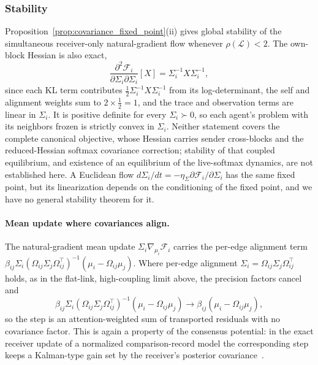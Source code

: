 \documentclass[11pt]{article}
\begin{document}
\subsubsection{Stability}

Proposition~\ref{prop:covariance_fixed_point}(ii) gives global stability of the simultaneous receiver-only natural-gradient flow whenever $\rho(\mathcal{L}) < 2$. The own-block Hessian is also exact,
\begin{equation}
\frac{\partial^2 \mathcal{F}_i}{\partial \Sigma_i \partial \Sigma_i}[X]
= \Sigma_i^{-1} X \Sigma_i^{-1},
\end{equation}
since each KL term contributes $\tfrac{1}{2}\Sigma_i^{-1}X\Sigma_i^{-1}$ from its log-determinant, the self and alignment weights sum to $2 \times \tfrac{1}{2} = 1$, and the trace and observation terms are linear in $\Sigma_i$. It is positive definite for every $\Sigma_i \succ 0$, so each agent's problem with its neighbors frozen is strictly convex in $\Sigma_i$. Neither statement covers the complete canonical objective, whose Hessian carries sender cross-blocks and the reduced-Hessian softmax covariance correction; stability of that coupled equilibrium, and existence of an equilibrium of the live-softmax dynamics, are not established here. A Euclidean flow $d\Sigma_i/dt = -\eta_\Sigma\partial\mathcal{F}_i/\partial\Sigma_i$ has the same fixed point, but its linearization depends on the conditioning of the fixed point, and we have no general stability theorem for it.

\paragraph{Mean update where covariances align.}
The natural-gradient mean update $\Sigma_i\nabla_{\mu_i}\mathcal{F}_i$ carries the per-edge alignment term $\beta_{ij} \Sigma_i (\Omega_{ij}\Sigma_j\Omega_{ij}^\top)^{-1}(\mu_i - \Omega_{ij}\mu_j)$. Where per-edge alignment $\Sigma_i = \Omega_{ij}\Sigma_j\Omega_{ij}^\top$ holds, as in the flat-link, high-coupling limit above, the precision factors cancel and
\begin{equation}
\beta_{ij} \Sigma_i (\Omega_{ij}\Sigma_j\Omega_{ij}^\top)^{-1}(\mu_i - \Omega_{ij}\mu_j) \longrightarrow \beta_{ij}(\mu_i - \Omega_{ij}\mu_j),
\end{equation}
so the step is an attention-weighted sum of transported residuals with no covariance factor. This is again a property of the consensus potential: in the exact receiver update of a normalized comparison-record model the corresponding step keeps a Kalman-type gain set by the receiver's posterior covariance~\cite[Ch.~6, exact receiver update]{DennisGaugeVFE2026}.
\end{document}
